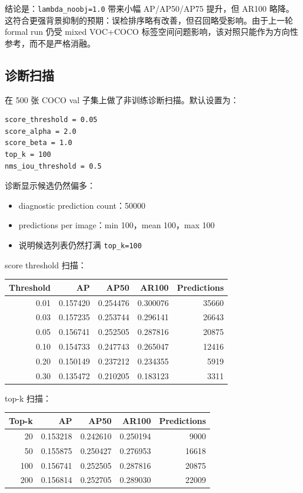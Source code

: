 \documentclass[UTF8]{ctexart}
\begin{document}
结论是：\texttt{lambda\_noobj=1.0} 带来小幅 AP/AP50/AP75 提升，但 AR100 略降。这符合更强背景抑制的预期：误检排序略有改善，但召回略受影响。由于上一轮 formal run 仍受 mixed VOC+COCO 标签空间问题影响，该对照只能作为方向性参考，而不是严格消融。

\subsection{诊断扫描}

在 500 张 COCO val 子集上做了非训练诊断扫描。默认设置为：

\begin{verbatim}
score_threshold = 0.05
score_alpha = 2.0
score_beta = 1.0
top_k = 100
nms_iou_threshold = 0.5
\end{verbatim}

诊断显示候选仍然偏多：

\begin{itemize}[leftmargin=2em]
  \item diagnostic prediction count：50000
  \item predictions per image：min 100，mean 100，max 100
  \item 说明候选列表仍然打满 \texttt{top\_k=100}
\end{itemize}

score threshold 扫描：

\begin{center}
\begin{tabular}{rrrrr}
\toprule
Threshold & AP & AP50 & AR100 & Predictions \\
\midrule
0.01 & 0.157420 & 0.254476 & 0.300076 & 35660 \\
0.03 & 0.157235 & 0.253744 & 0.296141 & 26643 \\
0.05 & 0.156741 & 0.252505 & 0.287816 & 20875 \\
0.10 & 0.154733 & 0.247743 & 0.265047 & 12416 \\
0.20 & 0.150149 & 0.237212 & 0.234355 & 5919 \\
0.30 & 0.135472 & 0.210205 & 0.183123 & 3311 \\
\bottomrule
\end{tabular}
\end{center}

top-k 扫描：

\begin{center}
\begin{tabular}{rrrrr}
\toprule
Top-k & AP & AP50 & AR100 & Predictions \\
\midrule
20 & 0.153218 & 0.242610 & 0.250194 & 9000 \\
50 & 0.155875 & 0.250427 & 0.276953 & 16618 \\
100 & 0.156741 & 0.252505 & 0.287816 & 20875 \\
200 & 0.156814 & 0.252705 & 0.289030 & 22009 \\
\bottomrule
\end{tabular}
\end{center}
\end{document}
